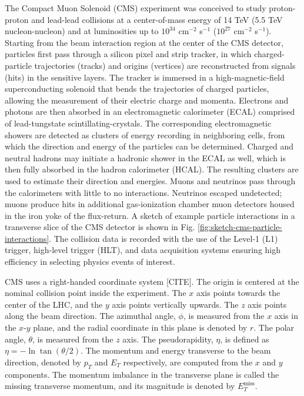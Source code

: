 \documentclass{article}
\begin{document}
The Compact Muon Solenoid (CMS) experiment was conceived to study proton-proton and lead-lead collisions at a center-of-mass energy of 14 TeV (5.5 TeV nucleon-nucleon) and at luminosities up to $10^{34}$ cm$^{-2}$ s$^{-1}$ ($10^{27}$ cm$^{-2}$ s$^{-1}$). Starting from the beam interaction region at the center of the CMS detector, particles first pass through a silicon pixel and strip tracker, in which charged-particle trajectories (tracks) and origins (vertices) are reconstructed from signals (hits) in the sensitive layers. The tracker is immersed in a high-magnetic-field superconducting solenoid that bends the trajectories of charged particles, allowing the measurement of their electric charge and momenta. Electrons and photons are then absorbed in an electromagnetic calorimeter (ECAL) comprised of lead-tungstate scintillating-crystals. The corresponding electromagnetic showers are detected as clusters of energy recording in neighboring cells, from which the direction and energy of the particles can be determined. Charged and neutral hadrons may initiate a hadronic shower in the ECAL as well, which is then fully absorbed in the hadron calorimeter (HCAL). The resulting clusters are used to estimate their direction and energies. Muons and neutrinos pass through the calorimeters with little to no interactions. Neutrinos escaped undetected; muons produce hits in additional gas-ionization chamber muon detectors housed in the iron yoke of the flux-return. A sketch of example particle interactions in a transverse slice of the CMS detector is shown in Fig. \ref{fig:sketch-cms-particle-interactions}. The collision data is recorded with the use of the Level-1 (L1) trigger, high-level trigger (HLT), and data acquisition systems ensuring high efficiency in selecting physics events of interest. 


CMS uses a right-handed coordinate system [CITE]. The origin is centered at the nominal collision point inside the experiment. The $x$ axis points towards the center of the LHC, and the $y$ axis points vertically upwards. The $z$ axis points along the beam direction. The azimuthal angle, $\phi$, is measured from the $x$ axis in the $x$-$y$ plane, and the radial coordinate in this plane is denoted by $r$. The polar angle, $\theta$, is measured from the $z$ axis. The pseudorapidity, $\eta$, is defined as $\eta = -\ln \tan(\theta/2)$. The momentum and energy transverse to the beam direction, denoted by $p_{T}$ and $E_{T}$ respectively, are computed from the $x$ and $y$ components. The momentum imbalance in the transverse plane is called the missing transverse momentum, and its magnitude is denoted by $E_{T}^{\text{miss}}$.
\end{document}
